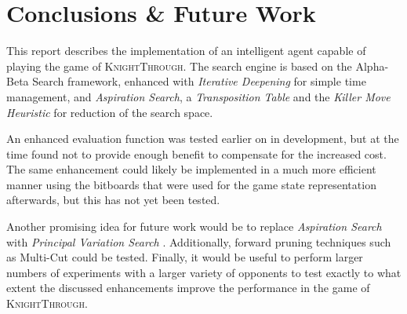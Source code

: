 \documentclass{article}
\begin{document}
\section{Conclusions \& Future Work} \label{SectionConclusions}
This report describes the implementation of an intelligent agent capable of playing the game of \textsc{KnightThrough}. The search engine is based on the Alpha-Beta Search framework, enhanced with \emph{Iterative Deepening} for simple time management, and \emph{Aspiration Search}, a \emph{Transposition Table} and the \emph{Killer Move Heuristic} for reduction of the search space.

An enhanced evaluation function was tested earlier on in development, but at the time found not to provide enough benefit to compensate for the increased cost. The same enhancement could likely be implemented in a much more efficient manner using the bitboards that were used for the game state representation afterwards, but this has not yet been tested.

Another promising idea for future work would be to replace \emph{Aspiration Search} with \emph{Principal Variation Search} \cite{Marsland1982}. Additionally, forward pruning techniques such as Multi-Cut \cite{MultiCut1999} could be tested. Finally, it would be useful to perform larger numbers of experiments with a larger variety of opponents to test exactly to what extent the discussed enhancements improve the performance in the game of \textsc{KnightThrough}.



\end{document}
